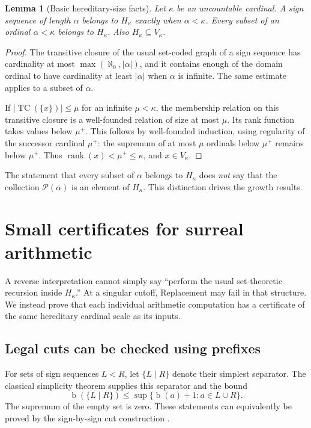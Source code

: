 \documentclass[11pt,letterpaper]{article}
\newtheorem{lemma}[theorem]{Lemma}
\theoremstyle{definition}
\theoremstyle{remark}
\newcommand{\bd}{\operatorname{b}}
\newcommand{\TC}{\operatorname{TC}}
\newcommand{\Pow}{\mathcal P}
\newcommand{\card}[1]{\lvert#1\rvert}
\newcommand{\rank}{\operatorname{rank}}
\begin{document}
\begin{lemma}[Basic hereditary-size facts]
\label{lem:hereditary}
Let $\kappa$ be an uncountable cardinal.
A sign sequence of length $\alpha$ belongs to $H_\kappa$ exactly when
$\alpha<\kappa$. Every subset of an ordinal $\alpha<\kappa$ belongs to
$H_\kappa$. Also $H_\kappa\subseteq V_\kappa$.
\end{lemma}
\begin{proof}
The transitive closure of the usual set-coded graph of a sign sequence has
cardinality at most $\max(\aleph_0,\card\alpha)$, and it contains enough of
the domain ordinal to have cardinality at least $\card\alpha$ when $\alpha$
is infinite. The same estimate applies to a subset of $\alpha$.

If $\card{\TC(\{x\})}\le\mu$ for an infinite $\mu<\kappa$, the membership
relation on this transitive closure is a well-founded relation of size at
most $\mu$. Its rank function takes values below $\mu^+$. This follows by
well-founded induction, using regularity of the successor cardinal $\mu^+$:
the supremum of at most $\mu$ ordinals below $\mu^+$ remains below $\mu^+$.
Thus $\rank(x)<\mu^+\le\kappa$, and $x\in V_\kappa$.
\end{proof}

The statement that every subset of $\alpha$ belongs to $H_\kappa$ does
\emph{not} say that the collection $\Pow(\alpha)$ is an element of
$H_\kappa$. This distinction drives the growth results.

\section{Small certificates for surreal arithmetic}
\label{sec:certificates}

A reverse interpretation cannot simply say ``perform the usual set-theoretic
recursion inside $H_\kappa$.'' At a singular cutoff, Replacement may fail in
that structure. We instead prove that each individual arithmetic computation
has a certificate of the same hereditary cardinal scale as its inputs.

\subsection{Legal cuts can be checked using prefixes}

For sets of sign sequences $L<R$, let $\{L\mid R\}$ denote their simplest
separator. The classical simplicity theorem supplies this separator and the
bound
\begin{equation}
 \bd(\{L\mid R\})\le
 \sup\{\bd(a)+1:a\in L\cup R\}.
 \label{eq:cut-bound}
\end{equation}
The supremum of the empty set is zero. These statements can equivalently be
proved by the sign-by-sign cut construction \cite{Gonshor}.
\end{document}
